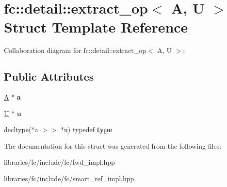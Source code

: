 \hypertarget{structfc_1_1detail_1_1extract__op}{}\section{fc\+:\+:detail\+:\+:extract\+\_\+op$<$ A, U $>$ Struct Template Reference}
\label{structfc_1_1detail_1_1extract__op}


Collaboration diagram for fc\+:\+:detail\+:\+:extract\+\_\+op$<$ A, U $>$\+:
\subsection*{Public Attributes}
\begin{DoxyCompactItemize}
\item 
\mbox{\label{structfc_1_1detail_1_1extract__op_a1ca0760ec1111da0fd4d0079a7c27b42}} 
\mbox{\hyperlink{struct_a}{A}} $\ast$ {\bfseries a}
\item 
\mbox{\label{structfc_1_1detail_1_1extract__op_a3a8111081ad9dfac1a4c33729e16ad67}} 
\mbox{\hyperlink{union_u}{U}} $\ast$ {\bfseries u}
\item 
\mbox{\label{structfc_1_1detail_1_1extract__op_abd83527057d56b69540894002e4c7994}} 
decltype($\ast$a $>$$>$ $\ast$u) typedef {\bfseries type}
\end{DoxyCompactItemize}


The documentation for this struct was generated from the following files\+:\begin{DoxyCompactItemize}
\item 
libraries/fc/include/fc/fwd\+\_\+impl.\+hpp\item 
libraries/fc/include/fc/smart\+\_\+ref\+\_\+impl.\+hpp\end{DoxyCompactItemize}
